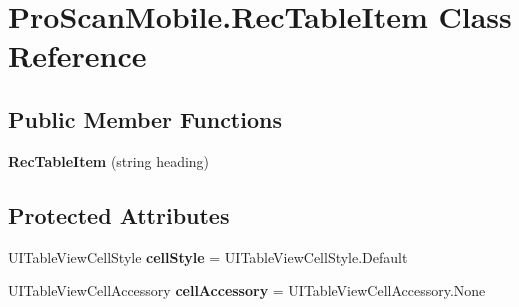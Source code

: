 \hypertarget{class_pro_scan_mobile_1_1_rec_table_item}{\section{Pro\-Scan\-Mobile.\-Rec\-Table\-Item Class Reference}
\label{class_pro_scan_mobile_1_1_rec_table_item}
}
\subsection*{Public Member Functions}
\begin{DoxyCompactItemize}
\item 
\hypertarget{class_pro_scan_mobile_1_1_rec_table_item_af836481c2bc1b8a31c6f445a2e9f2fc4}{{\bfseries Rec\-Table\-Item} (string heading)}\label{class_pro_scan_mobile_1_1_rec_table_item_af836481c2bc1b8a31c6f445a2e9f2fc4}

\end{DoxyCompactItemize}
\subsection*{Protected Attributes}
\begin{DoxyCompactItemize}
\item 
\hypertarget{class_pro_scan_mobile_1_1_rec_table_item_a93f4d1d5f688e7b6d8b6a7a8e015e9df}{U\-I\-Table\-View\-Cell\-Style {\bfseries cell\-Style} = U\-I\-Table\-View\-Cell\-Style.\-Default}\label{class_pro_scan_mobile_1_1_rec_table_item_a93f4d1d5f688e7b6d8b6a7a8e015e9df}

\item 
\hypertarget{class_pro_scan_mobile_1_1_rec_table_item_ab59f5fb9e815c173550ae6bfc8691f11}{U\-I\-Table\-View\-Cell\-Accessory {\bfseries cell\-Accessory} = U\-I\-Table\-View\-Cell\-Accessory.\-None}\label{class_pro_scan_mobile_1_1_rec_table_item_ab59f5fb9e815c173550ae6bfc8691f11}

\end{DoxyCompactItemize}
